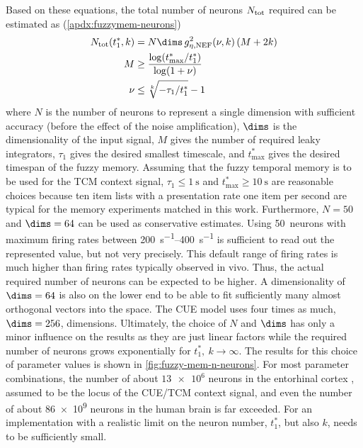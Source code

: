 Based on these equations, the total number of neurons $N_{{\mathrm{tot}}}$ required can be estimated as (\cref{apdx:fuzzymem-neurons})
\begin{align}
    N_{\ped{tot}}(t^*_1, k) &= N \dims\, g_{\eta,\ped{NEF}}^2(\nu, k) \del{M + 2k} \label{eqn:fuzzy-n-neurons}\\
    M &\geq \frac{\log(t^*_{\max} / t^*_1)}{\log(1 + \nu)} \\
    \nu &\leq \sqrt[k]{-\tau_1 / t^*_1} - 1
\end{align}
where $N$ is the number of neurons to represent a single dimension with sufficient accuracy (before the effect of the noise amplification), $\dims$ is the dimensionality of the input signal, $M$ gives the number of required leaky integrators, $\tau_1$ gives the desired smallest timescale, and $t^*_{\max}$ gives the desired timespan of the fuzzy memory.
Assuming that the fuzzy temporal memory is to be used for the TCM context signal, $\tau_1 \leq \SI{1}{\second}$ and $t^*_{\max} \geq \SI{10}{\second}$ are reasonable choices because ten item lists with a presentation rate one item per second are typical for the memory experiments matched in this work.
Furthermore, $N = 50$ and $\dims = 64$ can be used as conservative estimates.
Using \num{50}~neurons with maximum firing rates between \SIrange{200}{400}{\second^{-1}} is sufficient to read out the represented value, but not very precisely.
This default range of firing rates is much higher than firing rates typically observed in vivo.
Thus, the actual required number of neurons can be expected to be higher.
A dimensionality of $\dims = 64$ is also on the lower end to be able to fit sufficiently many almost orthogonal vectors into the space.
The CUE model uses four times as much, $\dims = 256$, dimensions.
Ultimately, the choice of $N$ and $\dims$ has only a minor influence on the results as they are just linear factors while the required number of neurons grows exponentially for $t^*_1,\ k \rightarrow \infty$.
The results for this choice of parameter values is shown in \cref{fig:fuzzy-mem-n-neurons}.
For most parameter combinations, the number of about $\num{13e6}$ neurons in the entorhinal cortex \parencite{west1998}, assumed to be the locus of the CUE/TCM context signal, and even the number of about \num{86e9} neurons in the human brain \parencite{azevedo2009} is far exceeded.
For an implementation with a realistic limit on the neuron number, $t^*_1$, but also $k$, needs to be sufficiently small.

